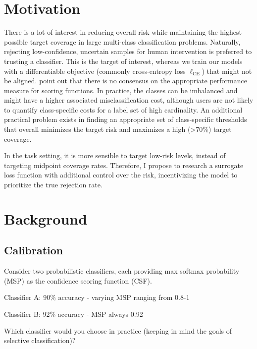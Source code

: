 
\section{Motivation}

There is a lot of interest in reducing overall risk while maintaining the highest possible target coverage in large multi-class classification problems. Naturally, rejecting low-confidence, uncertain samples for human intervention is preferred to trusting a classifier. 
This is the target of interest, whereas we train our models with a differentiable objective (commonly cross-entropy loss $\ell_{\mathrm{CE}}$) that might not be aligned. \cite{geifman2017selective,geifman2018bias} point out that there is no consensus on the appropriate performance measure for scoring functions.
In practice, the classes can be imbalanced and might have a higher associated misclassification cost, although users are not likely to quantify class-specific costs for a label set of high cardinality. %
An additional practical problem exists in finding an appropriate set of class-specific thresholds that overall minimizes the target risk and maximizes a high (>70\%) target coverage. 

In the \DC{} task setting, it is more sensible to target low-risk levels, instead of targeting midpoint coverage rates. Therefore, I propose to research a surrogate loss function with additional control over the risk, incentivizing the model to prioritize the true rejection rate. 


\section{Background}

\subsection{Calibration}



\noindent \begin{uuyellowbox}[title=Top-1 calibration does not imply good failure prediction \cite{zhu2022rethinking}]

    Consider two probabilistic classifiers, each providing max softmax probability (MSP) as the confidence scoring function (CSF).\newline

    Classifier A: 90\% accuracy - varying MSP ranging from 0.8-1
    
    Classifier B: 92\% accuracy - MSP always 0.92\newline

    Which classifier would you choose in practice (keeping in mind the goals of selective classification)?
    
\end{uuyellowbox}



